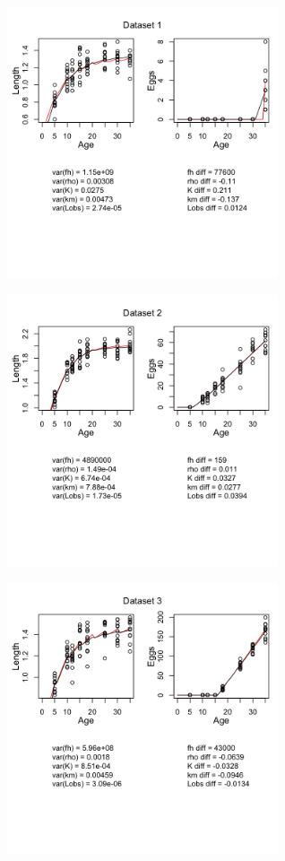 \documentclass[12pt,reqno,final,pdftex]{amsart}\usepackage[]{graphicx}\usepackage[]{color}
\newenvironment{knitrout}{}{} %
\theoremstyle{plain}
\numberwithin{equation}{part}
\begin{document}
\begin{knitrout}\scriptsize
{}\color{fgcolor}

\includegraphics[width=0.6\textwidth]{figure/unnamed-chunk-5-1} \hfill{}




\includegraphics[width=0.6\textwidth]{figure/unnamed-chunk-5-2} \hfill{}




\includegraphics[width=0.6\textwidth]{figure/unnamed-chunk-5-3} \hfill{}





\end{knitrout}
\end{document}
